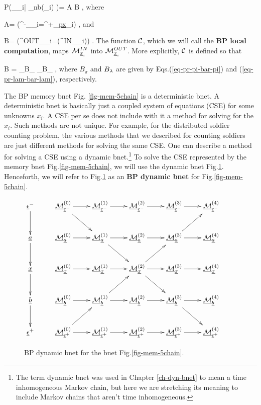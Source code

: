 \beq\color{blue}
P(\calm_{\rvx_i}|
\calm_{\rvn\in nb(\rvx_i)}
)= A B
\;,
\eeq
where

\beq
A=
\indi(\calm^{-}_{\rvx_i}=\calm^{+}_{\ul{px}_i})
\;,
\eeq
and

\beq
B=
\indi(\calm^{OUT}_{\rvx_i}=\calc(\calm^{IN}_{\rvx_i}))
\label{eq-mp-update-static}
\;.
\eeq
The function ${\cal C}$,
which 
we will call the {\bf BP local computation},
maps ${\cal M}^{IN}_{{\underline{x}}_i}$
into ${\cal M}^{OUT}_{{\underline{x}}_i}$. More explicitly,
${\cal C}$ is defined so that

\beq
B
=
_{B_\pi}
_{B_\pi}
\;,
\eeq
where
$B_\pi$ and $B_\lambda$
are given by Eqs.(\ref{eq-pr-pi-bar-pi})
and (\ref{eq-pr-lam-bar-lam}),
respectively.



The BP memory bnet
 Fig.
\ref{fig-mem-5chain}
is a deterministic bnet.
A deterministic bnet
is basically
just a coupled system
of equations (CSE)
for some unknowns $x_i$. 
A CSE per se does not
include with it a method for  
solving for the $x_i$. Such methods are not
unique.
For example,
for the 
distributed
soldier counting 
problem,
the various 
methods that
we described
for counting soldiers
are just different
methods 
for solving the same
CSE.
One can describe 
a method for solving a
CSE using a dynamic
bnet.\footnote{
The term
dynamic bnet
was used in Chapter \ref{ch-dyn-bnet}
to mean a time inhomogeneous
Markov chain, but 
here we are stretching its meaning to
include
Markov chains
that aren't 
time inhomogeneous.}
To solve
the CSE
represented by
the memory bnet Fig.\ref{fig-mem-5chain},
we will use the 
dynamic bnet 
Fig.\ref{fig-propagation-5chain}.
Henceforth, 
we will refer to
Fig.\ref{fig-propagation-5chain} as
an {\bf BP dynamic bnet}
for Fig.\ref{fig-mem-5chain}.

\begin{figure}
$$\xymatrix{
\rveps^-\ar[d]
&\ucalm^{(0)}_{\rveps^-}\ar[r]\ar[dr]
&\ucalm^{(1)}_{\rveps^-}\ar[r]
&\ucalm^{(2)}_{\rveps^-}\ar[r]
&\ucalm^{(3)}_{\rveps^-}\ar[r]
&\ucalm^{(4)}_{\rveps^-}
&
\\
\rva\ar[d]
&\ucalm^{(0)}_{\rva}\ar[r]
&\ucalm^{(1)}_{\rva}\ar[r]\ar[dr]
&\ucalm^{(2)}_{\rva}\ar[r]
&\ucalm^{(3)}_{\rva}\ar[r]\ar[ur]
&\ucalm^{(4)}_{\rva}
\\
\rvx\ar[d]
&\ucalm^{(0)}_{\rvx}\ar[r]
&\ucalm^{(1)}_{\rvx}\ar[r]
&\ucalm^{(2)}_{\rvx}\ar[r]\ar[dr]\ar[ur]
&\ucalm^{(3)}_{\rvx}\ar[r]
&\ucalm^{(4)}_{\rvx}
\\
\rvb\ar[d]
&\ucalm^{(0)}_{\rvb}\ar[r]
&\ucalm^{(1)}_{\rvb}\ar[r]\ar[ur]
&\ucalm^{(2)}_{\rvb}\ar[r]
&\ucalm^{(3)}_{\rvb}\ar[r]\ar[dr]
&\ucalm^{(4)}_{\rvb}
\\
\rveps^+
&\ucalm^{(0)}_{\rveps^+}\ar[r]\ar[ur]
&\ucalm^{(1)}_{\rveps^+}\ar[r]
&\ucalm^{(2)}_{\rveps^+}\ar[r]
&\ucalm^{(3)}_{\rveps^+}\ar[r]
&\ucalm^{(4)}_{\rveps^+}
}$$
\caption{BP dynamic bnet for the bnet
  Fig.\ref{fig-mem-5chain}.}
\label{fig-propagation-5chain}
\end{figure}


